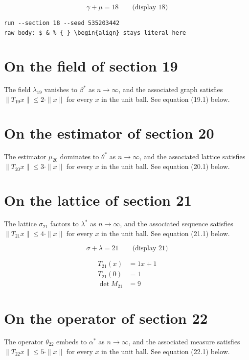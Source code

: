 \documentclass{article}
\begin{document}
$$
\gamma + \mu = 18 \qquad \text{(display 18)}
$$

\begin{verbatim}
run --section 18 --seed 535203442
raw body: $ & % { } \begin{align} stays literal here
\end{verbatim}

\section{On the field of section 19}
The field $\lambda_{19}$ vanishes to $\beta^{*}$ as $n \to \infty$,
and the associated graph satisfies $\|T_{19} x\| \leq 2 \cdot \|x\|$
for every $x$ in the unit ball. See equation (19.1) below.

\section{On the estimator of section 20}
The estimator $\mu_{20}$ dominates to $\theta^{*}$ as $n \to \infty$,
and the associated lattice satisfies $\|T_{20} x\| \leq 3 \cdot \|x\|$
for every $x$ in the unit ball. See equation (20.1) below.

\section{On the lattice of section 21}
The lattice $\sigma_{21}$ factors to $\lambda^{*}$ as $n \to \infty$,
and the associated sequence satisfies $\|T_{21} x\| \leq 4 \cdot \|x\|$
for every $x$ in the unit ball. See equation (21.1) below.

$$
\sigma + \lambda = 21 \qquad \text{(display 21)}
$$

\begin{align}
T_{21}(x) &= 1 x + 1 \\
T_{21}(0) &= 1 \\
\det M_{21} &= 9
\end{align}

\section{On the operator of section 22}
The operator $\theta_{22}$ embeds to $\alpha^{*}$ as $n \to \infty$,
and the associated measure satisfies $\|T_{22} x\| \leq 5 \cdot \|x\|$
for every $x$ in the unit ball. See equation (22.1) below.
\end{document}
